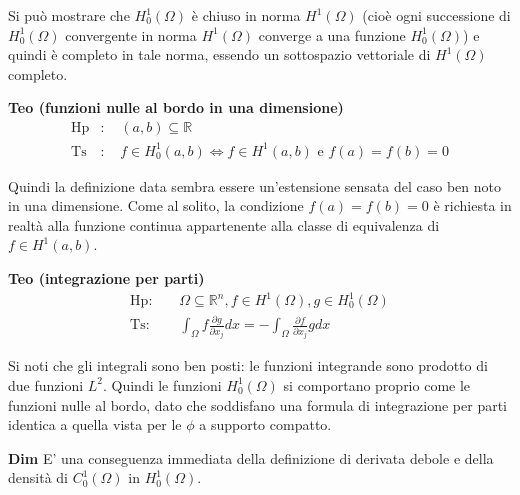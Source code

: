 \documentclass{article}
\begin{document}
Si pu\`{o} mostrare che $H_{0}^{1}\left( \Omega \right) $ \`{e} chiuso in
norma $H^{1}\left( \Omega \right) $ (cio\`{e} ogni successione di $%
H_{0}^{1}\left( \Omega \right) $ convergente in norma $H^{1}\left( \Omega
\right) $ converge a una funzione $H_{0}^{1}\left( \Omega \right) $) e
quindi \`{e} completo in tale norma, essendo un sottospazio vettoriale di $%
H^{1}\left( \Omega \right) $ completo.

\textbf{Teo (funzioni nulle al bordo in una dimensione)}%
\begin{eqnarray*}
\text{Hp} &\text{: }&\left( a,b\right) \subseteq 
\mathbb{R}
\\
\text{Ts} &\text{: }&f\in H_{0}^{1}\left( a,b\right) \Longleftrightarrow
f\in H^{1}\left( a,b\right) \text{ e }f\left( a\right) =f\left( b\right) =0
\end{eqnarray*}

Quindi la definizione data sembra essere un'estensione sensata del caso ben
noto in una dimensione. Come al solito, la condizione $f\left( a\right)
=f\left( b\right) =0$ \`{e} richiesta in realt\`{a} alla funzione continua
appartenente alla classe di equivalenza di $f\in H^{1}\left( a,b\right) $.

\textbf{Teo (integrazione per parti)}%
\begin{eqnarray*}
\text{Hp}\text{: } &&\Omega \subseteq 
\mathbb{R}
^{n},f\in H^{1}\left( \Omega \right) ,g\in H_{0}^{1}\left( \Omega \right) \\
\text{Ts}\text{: } &&\int_{\Omega }f\frac{\partial g}{\partial x_{j}}%
dx=-\int_{\Omega }\frac{\partial f}{\partial x_{j}}gdx
\end{eqnarray*}

Si noti che gli integrali sono ben posti: le funzioni integrande sono
prodotto di due funzioni $L^{2}$. Quindi le funzioni $H_{0}^{1}\left( \Omega
\right) $ si comportano proprio come le funzioni nulle al bordo, dato che
soddisfano una formula di integrazione per parti identica a quella vista per
le $\phi $ a supporto compatto.

\textbf{Dim} E' una conseguenza immediata della definizione di derivata
debole e della densit\`{a} di $C_{0}^{1}\left( \Omega \right) $ in $%
H_{0}^{1}\left( \Omega \right) $.
\end{document}
